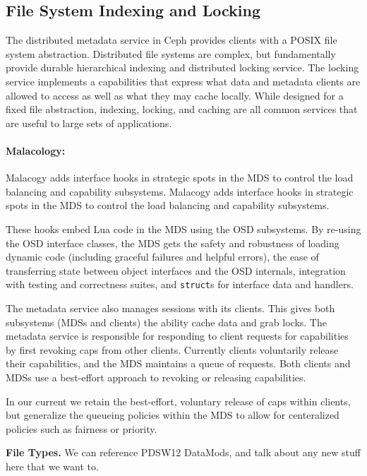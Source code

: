 \documentclass[10pt,twocolumn]{article}
\begin{document}
\subsection{File System Indexing and Locking}

The distributed metadata service in Ceph provides clients with a POSIX file
system abstraction. Distributed file systems are complex, but fundamentally
provide durable hierarchical indexing and distributed locking service.  The
locking service implements a capabilities that express what data and metadata
clients are allowed to access as well as what they may cache locally.  While
designed for a fixed file abstraction, indexing, locking, and caching are all
common services that are useful to large sets of applications.

\paragraph*{Malacology:} Malacogy adds interface hooks in strategic spots in the MDS to control the load balancing and capability subsystems.
Malacogy adds interface hooks in strategic spots in the MDS to control the load balancing and capability subsystems. 

These hooks embed Lua code in the MDS using the
OSD subsystems. By re-using the OSD interface classes, the MDS gets the safety and robustness of loading dynamic code (including graceful failures and helpful errors), the ease of transferring state between object
interfaces and the OSD internals, integration with testing and
correctness suites, and \texttt{struct}s for interface data and
handlers. 

The metadata service also manages sessions with its clients. This gives both subsystems (MDSs and clients) the ability cache data and grab locks. The metadata service is
responsible for responding to client requests for capabilities by first
revoking caps from other clients. Currently clients voluntarily
release their capabilities, and the MDS maintains a queue of requests.
Both clients and MDSs use a best-effort approach to revoking or releasing capabilities.

In our current we retain the best-effort, voluntary release of caps within
clients, but generalize the queueing policies within the MDS to allow for
centeralized policies such as fairness or priority.

{\bf File Types.}
We can reference PDSW12 DataMods, and talk about any new stuff here that we
want to.
\end{document}
